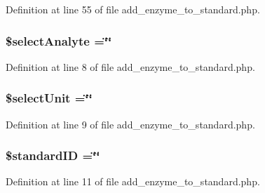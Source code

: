 Definition at line 55 of file add\-\_\-enzyme\-\_\-to\-\_\-standard.\-php.

\hypertarget{add__enzyme__to__standard_8php_ae5b99d173d7360be6556675a80036269}{
\subsubsection[{\$select\-Analyte}]{\setlength{\rightskip}{0pt plus 5cm}\$select\-Analyte =\char`\"{}\char`\"{}}}\label{add__enzyme__to__standard_8php_ae5b99d173d7360be6556675a80036269}


Definition at line 8 of file add\-\_\-enzyme\-\_\-to\-\_\-standard.\-php.

\hypertarget{add__enzyme__to__standard_8php_a427fdcd2d971a5567fb4d111d8de5f54}{
\subsubsection[{\$select\-Unit}]{\setlength{\rightskip}{0pt plus 5cm}\$select\-Unit =\char`\"{}\char`\"{}}}\label{add__enzyme__to__standard_8php_a427fdcd2d971a5567fb4d111d8de5f54}


Definition at line 9 of file add\-\_\-enzyme\-\_\-to\-\_\-standard.\-php.

\hypertarget{add__enzyme__to__standard_8php_a0c541a369e4a0434108a7d145751bb23}{
\subsubsection[{\$standard\-I\-D}]{\setlength{\rightskip}{0pt plus 5cm}\$standard\-I\-D =\char`\"{}\char`\"{}}}\label{add__enzyme__to__standard_8php_a0c541a369e4a0434108a7d145751bb23}


Definition at line 11 of file add\-\_\-enzyme\-\_\-to\-\_\-standard.\-php.

